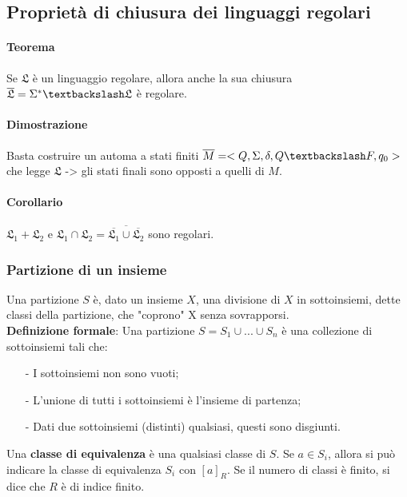 \documentclass[a4paper, 10pt]{report}
\begin{document}
\subsection*{Proprietà di chiusura dei linguaggi regolari}

\paragraph*{Teorema} Se $\mathfrak{L}$ è un linguaggio regolare, allora anche la sua chiusura $\mathfrak{\overline{L}} = \Sigma^* \textbackslash \mathfrak{L}$ è regolare.

\begin{tcolorbox}
\paragraph*{Dimostrazione} Basta costruire un automa a stati finiti $\overline{M}=<Q, \Sigma, \delta, Q\textbackslash F, q_0>$ che legge $\mathfrak{L}$ -> gli stati finali sono opposti a quelli di $M$.
\end{tcolorbox}

\paragraph*{Corollario} $\mathfrak{L}_1 + \mathfrak{L}_2$ e $\mathfrak{L}_1 \cap \mathfrak{L}_2 = \overline{\overline{\mathfrak{L}_1} \cup \overline{\mathfrak{L}_2}}$ sono regolari.

\subsubsection*{Partizione di un insieme}
Una partizione $S$ è, dato un insieme $X$, una divisione di $X$ in sottoinsiemi, dette classi della partizione, che "coprono" X senza sovrapporsi. \\

\noindent \textbf{Definizione formale}: Una partizione $S = S_1 \cup ... \cup S_n$ è una collezione di sottoinsiemi tali che:
\begin{itemize}
\item[-] I sottoinsiemi non sono vuoti;
\item[-] L'unione di tutti i sottoinsiemi è l'insieme di partenza;
\item[-] Dati due sottoinsiemi (distinti) qualsiasi, questi sono disgiunti.
\end{itemize}

\noindent Una \textbf{classe di equivalenza} è una qualsiasi classe di $S$. Se $a \in S_i$, allora si può indicare la classe di equivalenza $S_i$ con $[a]_R$. Se il numero di classi è finito, si dice che $R$ è di indice finito.
\end{document}
